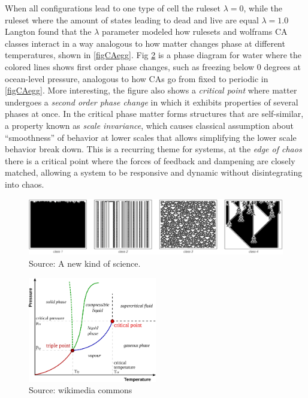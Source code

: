 When all configurations lead to one type of cell the ruleset $\lambda = 0$, while
the ruleset where the amount of states leading to dead and live are equal 
$\lambda = 1.0$
%
Langton found that the $\lambda$ parameter modeled how rulesets and wolframs CA
classes interact in a way analogous to how matter changes phase at different
temperatures, shown in \ref{figCAegg}.
%
Fig \ref{figPhase} is a phase diagram for water where the colored lines shows
first order phase changes, such as freezing below 0 degrees at ocean-level
pressure, analogous to how CAs go from fixed to periodic in \ref{figCAegg}.
%
More interesting, the figure also shows a \emph{critical point} where matter
undergoes a \emph{second order phase change} in which it exhibits properties of
several phases at once.
%
In the critical phase matter forms structures that are self-similar, a property
known as \emph{scale invariance}, which causes classical assumption about
``smoothness'' of behavior at lower scales that allows simplifying the lower
scale behavior break down.
%
This is a recurring theme for systems, at the \emph{edge of chaos} there is a
critical point where the forces of feedback and dampening are closely matched,
allowing a system to be responsive and dynamic without disintegrating into
chaos.
\begin{figure}[h!]
  \centering
  \includegraphics[width=1.0\textwidth]{fig/classesCA.png}
  \caption{Source: A new kind of science.}
  \label{figPhase}
\end{figure}
\begin{figure}[h!]
  \centering
  \includegraphics[width=0.5\textwidth]{fig/Phase.png}
  \caption{Source: wikimedia commons}
  \label{figPhase}
\end{figure}
